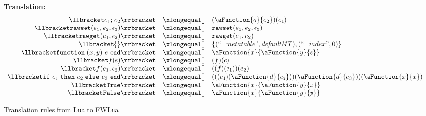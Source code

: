 \begin{figure}[P]
\caption{Translation rules from Lua to FWLua}

{\bf Translation:~~~    } 
\label{fig:translation}
\[
\begin{array}{rclcl}
\translate{e_1{\tt ;}~e_2}{(\aFunction{a}{e_2})(e_1)}
\translate{{\tt rawset}(e_1,e_2,e_3)}{{\tt rawset}(e_1,e_2,e_3)}
\translate{{\tt rawget}(e_1,e_2)}{{\tt rawget}(e_1,e_2)}
\translate{
    \{\}
}{
   \{(``\_metatable", {\it defaultMT}),(``\_index", 0)\}  
}

\translate{{\tt function}~(x,y)~e~{\tt end}}{\aFunction{x}{\aFunction{y}{e}}}
\translate{f(e)}{(f)(e)}
\translate{f(e_1,e_2)}{((f)(e_1))(e_2)}
\translate{
    {\tt if}~e_1~{\tt then}~e_2~{\tt else}~e_3~{\tt end}
}{
    (((e_1)(\aFunction{d}{e_2}))(\aFunction{d}{e_3}))(\aFunction{x}{x})
}
\translate{\tt True}{\aFunction{x}{\aFunction{y}{x}}}
\translate{\tt False}{\aFunction{x}{\aFunction{y}{y}}}

\end{array}
\]
\end{figure}


